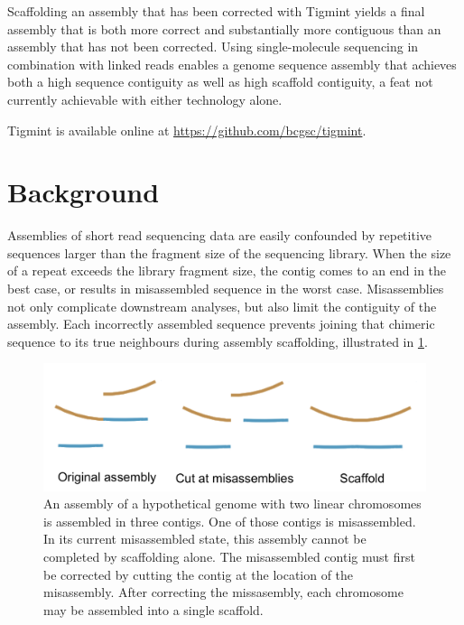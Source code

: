 \documentclass[
  12pt,
  oneside,
  openany]{book}
\begin{document}
Scaffolding an assembly that has been corrected with Tigmint yields a final assembly that is both more correct and substantially more contiguous than an assembly that has not been corrected. Using single-molecule sequencing in combination with linked reads enables a genome sequence assembly that achieves both a high sequence contiguity as well as high scaffold contiguity, a feat not currently achievable with either technology alone.

Tigmint is available online at \url{https://github.com/bcgsc/tigmint}.

\hypertarget{background}{%
\section{Background}\label{background}}

Assemblies of short read sequencing data are easily confounded by repetitive sequences larger than the fragment size of the sequencing library. When the size of a repeat exceeds the library fragment size, the contig comes to an end in the best case, or results in misassembled sequence in the worst case. Misassemblies not only complicate downstream analyses, but also limit the contiguity of the assembly. Each incorrectly assembled sequence prevents joining that chimeric sequence to its true neighbours during assembly scaffolding, illustrated in \cref{fig:diagram}.

\begin{figure}
\hypertarget{fig:diagram}{%
\centering
\includegraphics{tigmint/diagram.png}
\caption[An assembly of a hypothetical genome with two linear chromosomes is assembled in three contigs.]{An assembly of a hypothetical genome with two linear chromosomes is assembled in three contigs. One of those contigs is misassembled. In its current misassembled state, this assembly cannot be completed by scaffolding alone. The misassembled contig must first be corrected by cutting the contig at the location of the misassembly. After correcting the missasembly, each chromosome may be assembled into a single scaffold.}\label{fig:diagram}
}
\end{figure}
\end{document}
